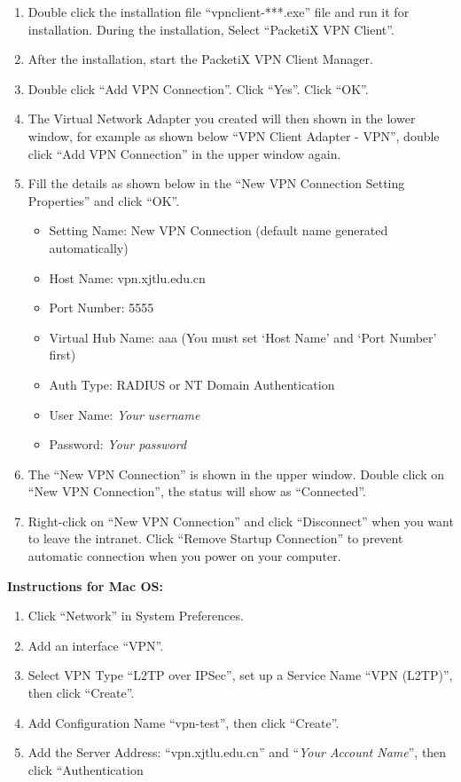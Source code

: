\documentclass[
]{book}
\providecommand{\tightlist}{%
  \setlength{\itemsep}{0pt}\setlength{\parskip}{0pt}}
\begin{document}
\begin{enumerate}
\def\labelenumi{\arabic{enumi}.}
\tightlist
\item
  Double click the installation file ``vpnclient-***.exe'' file and run it for installation. During the installation, Select ``PacketiX VPN Client''.
\item
  After the installation, start the PacketiX VPN Client Manager.
\item
  Double click ``Add VPN Connection''. Click ``Yes''. Click ``OK''.
\item
  The Virtual Network Adapter you created will then shown in the lower window, for example as shown below ``VPN Client Adapter - VPN'', double click ``Add VPN Connection'' in the upper window again.
\item
  Fill the details as shown below in the ``New VPN Connection Setting Properties'' and click ``OK''.

  \begin{itemize}
  \tightlist
  \item
    Setting Name: New VPN Connection (default name generated automatically)
  \item
    Host Name: vpn.xjtlu.edu.cn
  \item
    Port Number: 5555
  \item
    Virtual Hub Name: aaa (You must set `Host Name' and `Port Number' first)
  \item
    Auth Type: RADIUS or NT Domain Authentication
  \item
    User Name: \emph{Your username}
  \item
    Password: \emph{Your password}
  \end{itemize}
\item
  The ``New VPN Connection'' is shown in the upper window. Double click on ``New VPN Connection'', the status will show as ``Connected''.
\item
  Right-click on ``New VPN Connection'' and click ``Disconnect'' when you want to leave the intranet. Click ``Remove Startup Connection'' to prevent automatic connection when you power on your computer.
\end{enumerate}

\textbf{Instructions for Mac OS:}

\begin{enumerate}
\def\labelenumi{\arabic{enumi}.}
\item
  Click ``Network'' in System Preferences.
\item
  Add an interface ``VPN''.
\item
  Select VPN Type ``L2TP over IPSec'', set up a Service Name ``VPN (L2TP)'', then click ``Create''.
\item
  Add Configuration Name ``vpn-test'', then click ``Create''.
\item
  Add the Server Address: ``vpn.xjtlu.edu.cn'' and ``\emph{Your Account Name}'', then click ``Authentication
\end{enumerate}
\end{document}
